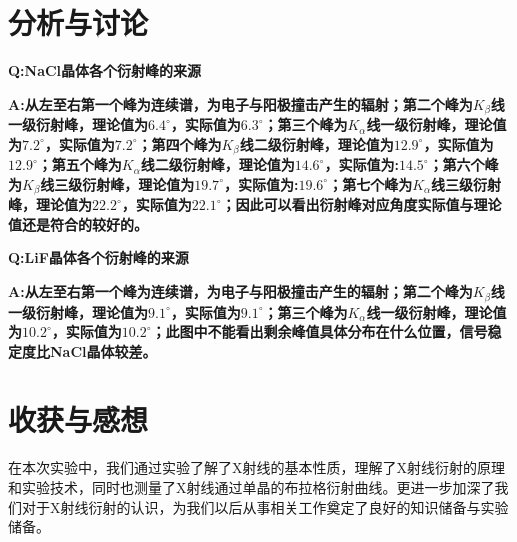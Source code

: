 \documentclass[UTF8]{ctexart}
\begin{document}
	\section{分析与讨论}
	\textbf{Q:NaCl晶体各个衍射峰的来源}
	\par \textbf{A:从左至右第一个峰为连续谱，为电子与阳极撞击产生的辐射；第二个峰为$K_{\beta}$线一级衍射峰，理论值为$6.4^{\circ}$，实际值为$6.3^{\circ}$；第三个峰为$K_{\alpha}$线一级衍射峰，理论值为$7.2^{\circ}$，实际值为$7.2^{\circ}$；第四个峰为$K_{\beta}$线二级衍射峰，理论值为$12.9^{\circ}$，实际值为$12.9^{\circ}$；第五个峰为$K_{\alpha}$线二级衍射峰，理论值为$14.6^{\circ}$，实际值为:$14.5^{\circ}$；第六个峰为$K_{\beta}$线三级衍射峰，理论值为$19.7^{\circ}$，实际值为:$19.6^{\circ}$；第七个峰为$K_{\alpha}$线三级衍射峰，理论值为$22.2^{\circ}$，实际值为$22.1^{\circ}$；因此可以看出衍射峰对应角度实际值与理论值还是符合的较好的。}
	\par \textbf{Q:LiF晶体各个衍射峰的来源}
	\par \textbf{A:从左至右第一个峰为连续谱，为电子与阳极撞击产生的辐射；第二个峰为$K_{\beta}$线一级衍射峰，理论值为$9.1^{\circ}$，实际值为$9.1^{\circ}$；第三个峰为$K_{\alpha}$线一级衍射峰，理论值为$10.2^{\circ}$，实际值为$10.2^{\circ}$；此图中不能看出剩余峰值具体分布在什么位置，信号稳定度比NaCl晶体较差。}
	\section{收获与感想}
	在本次实验中，我们通过实验了解了X射线的基本性质，理解了X射线衍射的原理和实验技术，同时也测量了X射线通过单晶的布拉格衍射曲线。更进一步加深了我们对于X射线衍射的认识，为我们以后从事相关工作奠定了良好的知识储备与实验储备。
\end{document}
